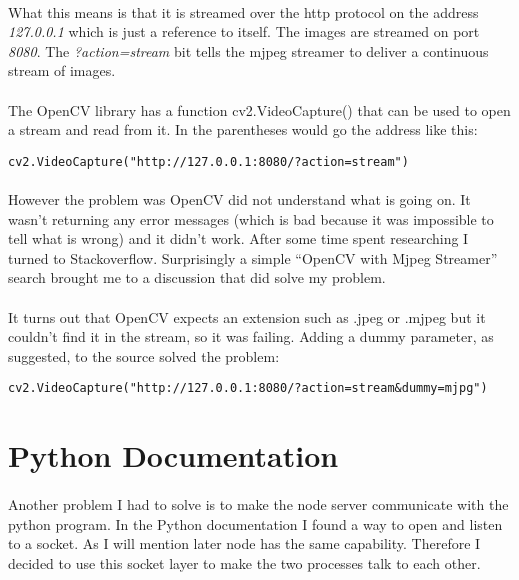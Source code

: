 \documentclass[12pt,a4paper]{report}
\begin{document}
\paragraph{}
What this means is that it is streamed over the http protocol on the address \textit{127.0.0.1} which is just a reference to itself. The images are streamed on port \textit{8080}. The \textit{?action=stream} bit tells the mjpeg streamer to deliver a continuous stream of images.


\paragraph{}
The OpenCV library has a function cv2.VideoCapture() that can be used to open a stream and read from it. In the parentheses would go the address like this: 
\\
\begin{lstlisting}
cv2.VideoCapture("http://127.0.0.1:8080/?action=stream")
\end{lstlisting}

\paragraph{}
However the problem was OpenCV did not understand what is going on. It wasn’t returning any error messages (which is bad because it was impossible to tell what is wrong) and it didn’t work. After some time spent researching I turned to Stackoverflow. Surprisingly a simple “OpenCV with Mjpeg Streamer” search brought me to a discussion that did solve my problem.

\paragraph{}
It turns out that OpenCV expects an extension such as .jpeg or .mjpeg but it couldn't find it in the stream, so it was failing. Adding a dummy parameter, as suggested, to the source solved the problem:
\\
\begin{lstlisting}
cv2.VideoCapture("http://127.0.0.1:8080/?action=stream&dummy=mjpg")
\end{lstlisting}

\section{Python Documentation}

\paragraph{}
Another problem I had to solve is to make the node server communicate with the python program. In the Python documentation I found a way to open and listen to a socket. As I will mention later node has the same capability. Therefore I decided to use this socket layer to make the two processes talk to each other.
\end{document}
